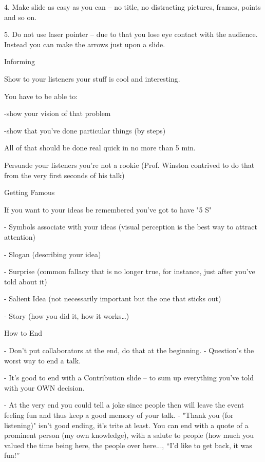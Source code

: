 \documentclass{report}
\begin{document}
4. Make slide as easy as you can – no title, no distracting pictures, frames, points and so on.

5. Do not use laser pointer – due to that you lose eye contact with the audience. Instead you can make the arrows just upon a slide. 



Informing

 

Show to your listeners your stuff is cool and interesting.

You have to be able to:

-show your vision of that problem

-show that you’ve done particular things (by steps)

All of that should be done real quick in no more than 5 min.

Persuade your listeners you’re not a rookie (Prof. Winston contrived to do that from the very first seconds of his talk)



Getting Famous

If you want to your ideas be remembered you’ve got to have
 "5 S"


- Symbols associate with your ideas (visual perception is the best way to attract attention)

- Slogan (describing your idea)

- Surprise (common fallacy that is no longer true, for instance, just after you’ve told about it)

- Salient Idea (not necessarily important but the one that sticks out)

- Story (how you did it, how it works…)



How to End



- Don’t put collaborators at the end, do that at the beginning.
- Question’s the worst way to end a talk.

- It’s good to end with a Contribution slide – to sum up everything you’ve told with your OWN decision.

- At the very end you could tell a joke since people then will leave the event feeling fun and thus keep a good memory of your talk.
- "Thank you (for listening)" isn’t good ending, it’s trite at least. You can end with a quote of a prominent person (my own knowledge), with a salute to people (how much you valued the time being here, the people over here..., “I’d like to get back, it was fun!”
\end{document}
